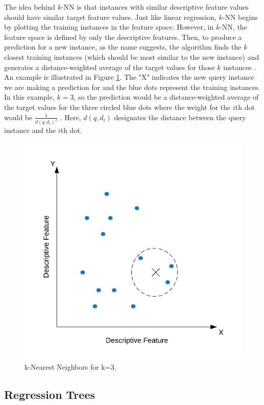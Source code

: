 \documentclass[pageno]{jpaper}
\begin{document}
The idea behind $k$-NN is that instances with similar descriptive feature values should have similar target feature values. Just like linear regression, $k$-NN begins by plotting the training instances in the feature space. However, in $k$-NN, the feature space is defined by only the descriptive features. Then, to produce a prediction for a new instance, as the name suggests, the algorithm finds the $k$ closest training instances (which should be most similar to the new instance) and generates a distance-weighted average of the target values for those $k$ instances \cite{mitfundamentals}. An example is illustrated in Figure \ref{fig:knn}. The "X" indicates the new query instance we are making a prediction for and the blue dots represent the training instances. In this example, $k=3$, so the prediction would be a distance-weighted average of the target values for the three circled blue dots where the weight for the $i$th dot would be $\frac{1}{d(q,d_i)^2}$ \cite{mitfundamentals}. Here, $d(q,d_i)$ designates the distance between the query instance and the $i$th dot.

\begin{figure}[hbt]
\centering
\includegraphics[width=0.5\linewidth]{kNN.png}
\caption{k-Nearest Neighbors for k=3.}
\label{fig:knn}
\end{figure}

\subsection{Regression Trees}
\end{document}
